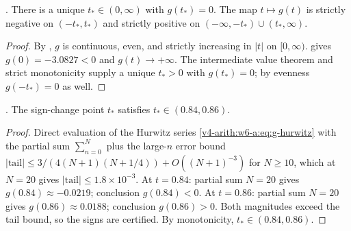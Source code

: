 \begin{theorem}
\label{v4-arith:w6-a:thm:t-star}
\ClaimStatusProvedHere. There is a unique \(t_{\ast}\in(0,\infty)\)
with \(g(t_{\ast})=0\). The map \(t\mapsto g(t)\) is strictly negative on
\((-t_{\ast},t_{\ast})\) and strictly positive on
\((-\infty,-t_{\ast})\cup(t_{\ast},\infty)\).
\end{theorem}

\begin{proof}
By , \(g\) is continuous, even, and
strictly increasing in \(|t|\) on \([0,\infty)\).
 gives \(g(0)=-3.0827<0\) and
\(g(t)\to+\infty\). The intermediate value theorem and strict
monotonicity supply a unique \(t_{\ast}>0\) with \(g(t_{\ast})=0\); by
evenness \(g(-t_{\ast})=0\) as well.
\end{proof}

\begin{proposition}
\label{v4-arith:w6-a:prop:t-star-numerical}
\ClaimStatusProvedHere. The sign-change point \(t_{\ast}\) satisfies
\(t_{\ast}\in(0.84,0.86)\).
\end{proposition}

\begin{proof}
Direct evaluation of the Hurwitz series
\eqref{v4-arith:w6-a:eq:g-hurwitz} with the partial sum
\(\sum_{n=0}^{N}\) plus the large-\(n\) error bound
\(|\text{tail}|\leq 3/(4(N+1)(N+1/4))+O((N+1)^{-3})\) for \(N\geq 10\),
which at \(N=20\) gives \(|\text{tail}|\leq 1.8\times 10^{-3}\).
At \(t=0.84\): partial sum \(N=20\) gives \(g(0.84)\approx-0.0219\);
conclusion \(g(0.84)<0\). At \(t=0.86\): partial sum
\(N=20\) gives \(g(0.86)\approx 0.0188\);
conclusion \(g(0.86)>0\). Both magnitudes exceed the tail bound, so the
signs are certified. By monotonicity,
\(t_{\ast}\in(0.84,0.86)\).
\end{proof}

